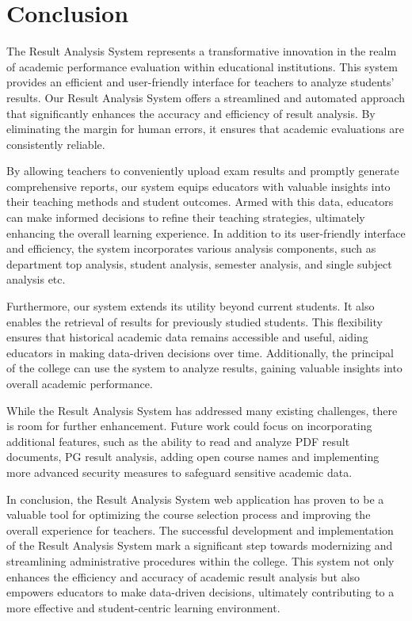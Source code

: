 \documentclass{nascproject}
\begin{document}
\chapter{Conclusion}

 The Result Analysis System represents a transformative innovation in the realm of academic performance evaluation within educational institutions. This system provides an efficient and user-friendly interface for teachers to analyze students' results. Our Result Analysis System offers a streamlined and automated approach that significantly enhances the accuracy and efficiency of result analysis. By eliminating the margin for human errors, it ensures that academic evaluations are consistently reliable.
 
 By allowing teachers to conveniently upload exam results and promptly generate comprehensive reports, our system equips educators with valuable insights into their teaching methods and student outcomes. Armed with this data, educators can make informed decisions to refine their teaching strategies, ultimately enhancing the overall learning experience. In addition to its user-friendly interface and efficiency, the system incorporates various analysis components, such as department top analysis, student analysis, semester analysis, and single subject analysis etc.
 
 Furthermore, our system extends its utility beyond current students. It also enables the retrieval of results for previously studied students. This flexibility ensures that historical academic data remains accessible and useful, aiding educators in making data-driven decisions over time. Additionally, the principal of the college can use the system to analyze results, gaining valuable insights into overall academic performance.
 
 While the Result Analysis System has addressed many existing challenges, there is room for further enhancement. Future work could focus on incorporating additional features, such as the ability to read and analyze PDF result documents, PG result analysis, adding open course names and implementing more advanced security measures to safeguard sensitive academic data.
 
 In conclusion, the Result Analysis System web application has proven to be a valuable tool for optimizing the course selection process and improving the overall experience for teachers. The successful development and implementation of the Result Analysis System mark a significant step towards modernizing and streamlining administrative procedures within the college. This system not only enhances the efficiency and accuracy of academic result analysis but also empowers educators to make data-driven decisions, ultimately contributing to a more effective and student-centric learning environment.
\end{document}
